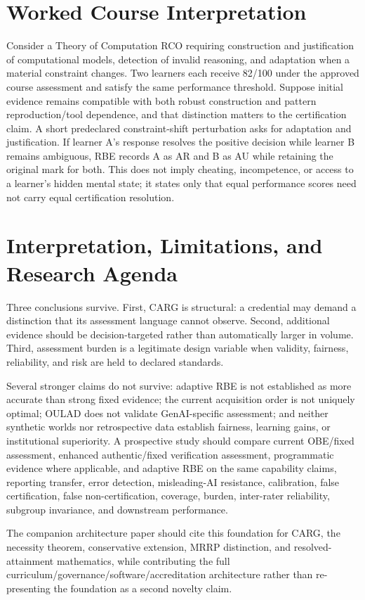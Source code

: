 \documentclass[11pt]{article}
\begin{document}
\section{Worked Course Interpretation}
Consider a Theory of Computation RCO requiring construction and justification of computational models, detection of invalid reasoning, and adaptation when a material constraint changes. Two learners each receive 82/100 under the approved course assessment and satisfy the same performance threshold. Suppose initial evidence remains compatible with both robust construction and pattern reproduction/tool dependence, and that distinction matters to the certification claim. A short predeclared constraint-shift perturbation asks for adaptation and justification. If learner A's response resolves the positive decision while learner B remains ambiguous, RBE records A as AR and B as AU while retaining the original mark for both. This does not imply cheating, incompetence, or access to a learner's hidden mental state; it states only that equal performance scores need not carry equal certification resolution.

\section{Interpretation, Limitations, and Research Agenda}
Three conclusions survive. First, CARG is structural: a credential may demand a distinction that its assessment language cannot observe. Second, additional evidence should be decision-targeted rather than automatically larger in volume. Third, assessment burden is a legitimate design variable when validity, fairness, reliability, and risk are held to declared standards.

Several stronger claims do not survive: adaptive RBE is not established as more accurate than strong fixed evidence; the current acquisition order is not uniquely optimal; OULAD does not validate GenAI-specific assessment; and neither synthetic worlds nor retrospective data establish fairness, learning gains, or institutional superiority. A prospective study should compare current OBE/fixed assessment, enhanced authentic/fixed verification assessment, programmatic evidence where applicable, and adaptive RBE on the same capability claims, reporting transfer, error detection, misleading-AI resistance, calibration, false certification, false non-certification, coverage, burden, inter-rater reliability, subgroup invariance, and downstream performance.

The companion architecture paper should cite this foundation for CARG, the necessity theorem, conservative extension, MRRP distinction, and resolved-attainment mathematics, while contributing the full curriculum/governance/software/accreditation architecture rather than re-presenting the foundation as a second novelty claim.
\end{document}
